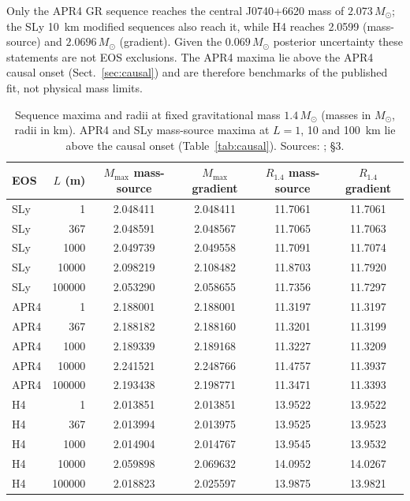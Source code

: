 \documentclass[11pt,a4paper]{article}
\newcommand{\Msun}{M_\odot}
\begin{document}
Only the APR4 GR sequence reaches the central J0740+6620 mass of $2.073\,\Msun$; the SLy 10~km modified
sequences also reach it, while H4 reaches 2.0599 (mass-source) and $2.0696\,\Msun$ (gradient). Given the
$0.069\,\Msun$ posterior uncertainty these statements are not EOS exclusions. The APR4 maxima lie above
the APR4 causal onset (Sect.~\ref{sec:causal}) and are therefore benchmarks of the published fit, not
physical mass limits.

\begin{table}[t]
\centering
\caption[]{Sequence maxima and radii at fixed gravitational mass $1.4\,\Msun$ (masses in $\Msun$, radii in km).
APR4 and SLy mass-source maxima at $L=1$, 10 and 100~km lie above the causal onset (Table~\ref{tab:causal}).
Sources: ;  \S3.}
\label{tab:full}
\begin{tabular}{lrcccc}
\toprule
EOS & $L$ (m) & $M_{\max}$ mass-source & $M_{\max}$ gradient & $R_{1.4}$ mass-source & $R_{1.4}$ gradient\\
\midrule
SLy & 1 & 2.048411 & 2.048411 & 11.7061 & 11.7061\\
SLy & 367 & 2.048591 & 2.048567 & 11.7065 & 11.7063\\
SLy & 1000 & 2.049739 & 2.049558 & 11.7091 & 11.7074\\
SLy & 10000 & 2.098219 & 2.108482 & 11.8703 & 11.7920\\
SLy & 100000 & 2.053290 & 2.058655 & 11.7356 & 11.7297\\
\midrule
APR4 & 1 & 2.188001 & 2.188001 & 11.3197 & 11.3197\\
APR4 & 367 & 2.188182 & 2.188160 & 11.3201 & 11.3199\\
APR4 & 1000 & 2.189339 & 2.189168 & 11.3227 & 11.3209\\
APR4 & 10000 & 2.241521 & 2.248766 & 11.4757 & 11.3937\\
APR4 & 100000 & 2.193438 & 2.198771 & 11.3471 & 11.3393\\
\midrule
H4 & 1 & 2.013851 & 2.013851 & 13.9522 & 13.9522\\
H4 & 367 & 2.013994 & 2.013975 & 13.9525 & 13.9523\\
H4 & 1000 & 2.014904 & 2.014767 & 13.9545 & 13.9532\\
H4 & 10000 & 2.059898 & 2.069632 & 14.0952 & 14.0267\\
H4 & 100000 & 2.018823 & 2.025597 & 13.9875 & 13.9821\\
\bottomrule
\end{tabular}
\end{table}
\end{document}
